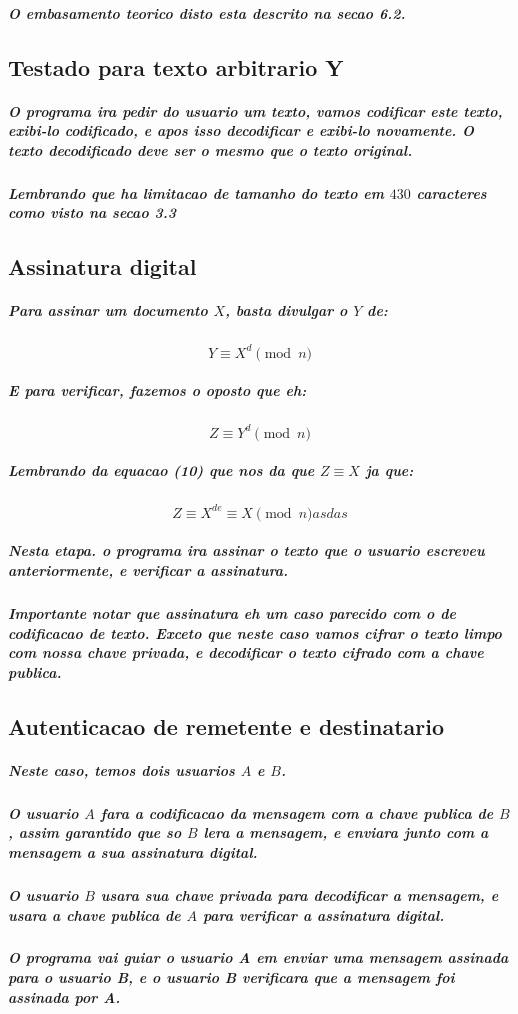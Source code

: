 \documentclass[12pt,twoside, a4paper, twocolumn]{article}
\begin{document}
\subparagraph*{O embasamento teorico disto esta descrito na secao 6.2.}

\subsection{Testado para texto arbitrario Y}

\subparagraph*{O programa ira pedir do usuario um texto, vamos codificar este texto, exibi-lo codificado, e apos isso decodificar e exibi-lo novamente. O texto decodificado deve ser o mesmo que o texto original.}

\subparagraph*{Lembrando que ha limitacao de tamanho do texto em $430$ caracteres como visto na secao 3.3}

\subsection{Assinatura digital}

\subparagraph*{Para assinar um documento $X$, basta divulgar o $Y$ de:}

\begin{equation}
    Y \equiv X^{d} \pmod{n}
\end{equation}

\subparagraph*{E para verificar, fazemos o oposto que eh:}

\begin{equation}
    Z \equiv Y^{ d} \pmod{n}
\end{equation}

\subparagraph*{Lembrando da equacao (10) que nos da que $Z \equiv X$ ja que:}

\begin{equation}
    Z \equiv X^{de} \equiv X \pmod{n}
    asdas
\end{equation}

\subparagraph*{Nesta etapa. o programa ira assinar o texto que o usuario escreveu anteriormente, e verificar a assinatura.}

\subparagraph*{Importante notar que assinatura eh um caso parecido com o de codificacao de texto. Exceto que neste caso vamos cifrar o texto limpo com nossa chave privada, e decodificar o texto cifrado com a chave publica.}

\subsection{Autenticacao de remetente e destinatario}

\subparagraph*{Neste caso, temos dois usuarios $A$ e $B$. }

\subparagraph*{O usuario $A$ fara a codificacao da mensagem com a chave publica de $B$, assim garantido que so $B$ lera a mensagem, e enviara junto com a mensagem a sua assinatura digital.}

\subparagraph*{O usuario $B$ usara sua chave privada para decodificar a mensagem, e usara a chave publica de $A$ para verificar a assinatura digital.}

\subparagraph*{O programa vai guiar o usuario A em enviar uma mensagem assinada para o usuario B, e o usuario B verificara que a mensagem foi assinada por A.}
\end{document}
